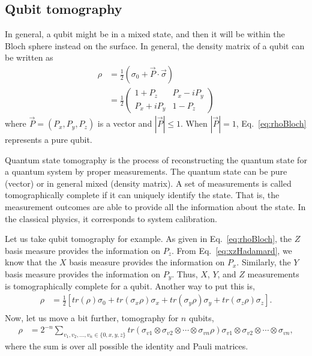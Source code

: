 \documentclass[onecolumn,pra,superscriptaddress,nofootinbib]{revtex4-1}
\begin{document}
\subsection{Qubit tomography}
In general, a qubit might be in a mixed state, and then it will be within the Bloch sphere instead on the surface. In general, the density matrix of a qubit can be written as
\begin{equation} \label{eq:rhoBloch}
\begin{aligned}
\rho &= \frac12(\sigma_0+\vec{P}\cdot \vec{\sigma}) \\
&= \frac12
    \begin{pmatrix}
      1+P_z&P_x-iP_y\\
      P_x+iP_y&1-P_z
    \end{pmatrix}
\end{aligned}
\end{equation}
where $\vec{P}=(P_x,P_y,P_z)$ is a vector and $|\vec{P}|\le1$. When $|\vec{P}|=1$, Eq.~\eqref{eq:rhoBloch} represents a pure qubit.

Quantum state tomography is the process of reconstructing the quantum state for a quantum system by proper measurements. The quantum state can be pure (vector) or in general mixed (density matrix). A set of measurements is called tomographically complete if it can uniquely identify the state. That is, the measurement outcomes are able to provide all the information about the state. In the classical physics, it corresponds to system calibration.

Let us take qubit tomography for example. As given in Eq.~\eqref{eq:rhoBloch}, the $Z$ basis measure provides the information on $P_z$. From Eq.~\eqref{eq:xzHadamard}, we know that the $X$ basis measure provides the information on $P_x$. Similarly, the $Y$ basis measure provides the information on $P_y$. Thus, $X$, $Y$, and $Z$ measurements is tomographically complete for a qubit. Another way to put this is,
\begin{equation} \label{eq:rho2tomo}
\begin{aligned}
\rho &= \frac12[tr(\rho)\sigma_0+tr(\sigma_x\rho)\sigma_x+tr(\sigma_y\rho)\sigma_y+tr(\sigma_z\rho)\sigma_z]. \\
\end{aligned}
\end{equation}
Now, let us move a bit further, tomography for $n$ qubits,
\begin{equation} \label{eq:rhontomo}
\begin{aligned}
\rho &= 2^{-n}\sum_{v_1,v_2,\dots,v_n\in\{0,x,y,z\}}tr(\sigma_{v1}\otimes\sigma_{v2}\otimes\cdots\otimes\sigma_{vn}\rho) \sigma_{v1}\otimes\sigma_{v2}\otimes\cdots\otimes\sigma_{vn},
\end{aligned}
\end{equation}
where the sum is over all possible the identity and Pauli matrices.
\end{document}
